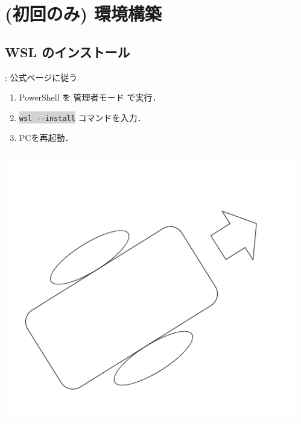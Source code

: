 \documentclass[aspectratio=169,dvipdfmx,cjk]{beamer}
\newcommand{\cmdline}[1]{
    \colorbox{lightgray}{\lstinline[style=command]{#1}}
}
\newcommand{\blue}[1]{ {\color{blue} #1} }
\begin{document}
\section{(初回のみ) 環境構築}

\subsection{WSL のインストール}
\begin{frame}{\insertsection \thesubsection: \insertsubsection}
  公式ページ\cite{WSL}に従う
  \begin{enumerate}
    \item PowerShell を\blue{管理者モード}で実行．
    \item \cmdline{wsl --install} コマンドを入力．
    \item PCを再起動．
  \end{enumerate}
  \begin{columns}
    \begin{column}{0.33\textwidth}
        \includegraphics[width=1.0\linewidth]{fig/robot.png}
    \end{column}
    \begin{column}{0.33\textwidth}

\end{column}
\end{columns}
\end{frame}
\end{document}
